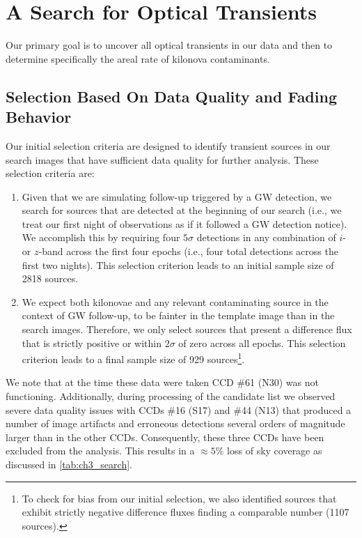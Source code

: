 \clearpage
\section{A Search for Optical Transients}
\label{sec:ch3_search}

Our primary goal is to uncover all optical transients in our data and then to determine specifically the areal rate of kilonova contaminants.

\subsection{Selection Based On Data Quality and Fading Behavior}
\label{sec:ch3_data_cuts}

Our initial selection criteria are designed to identify transient sources in our search images that have sufficient data quality for further analysis. These selection criteria are:

\begin{enumerate}
\item Given that we are simulating follow-up triggered by a GW detection, we search for sources that are detected at the beginning of our search (i.e., we treat our first night of observations as if it followed a GW detection notice). We accomplish this by requiring four $5\sigma$ detections in any combination of $i$- or $z$-band across the first four epochs (i.e., four total detections across the first two nights).  This selection criterion leads to an initial sample size of 2818 sources.

\item We expect both kilonovae and any relevant contaminating source in the context of GW follow-up, to be fainter in the template image than in the search images. Therefore, we only select sources that present a difference flux that is strictly positive or within $2\sigma$ of zero across all epochs. This selection criterion leads to a final sample size of 929 sources\footnote{\singlespace To check for bias from our initial selection, we also identified sources that exhibit strictly negative difference fluxes finding a comparable number (1107 sources).}.
\end{enumerate}

\clearpage
We note that at the time these data were taken CCD \#61 (N30) was not functioning. Additionally, during processing of the candidate list we observed severe data quality issues with CCDs \#16 (S17) and \#44 (N13) that produced a number of image artifacts and erroneous detections several orders of magnitude larger than in the other CCDs. Consequently, these three CCDs have been excluded from the analysis. This results in a $\approx 5\%$ loss of sky coverage as discussed in \cref{tab:ch3_search}.

